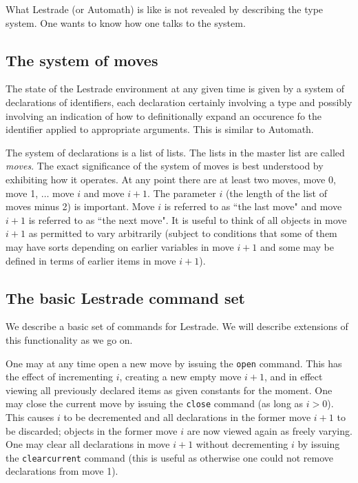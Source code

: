 \documentclass[12pt]{article}
\begin{document}
What Lestrade (or Automath) is like is not revealed by describing the type system.  One wants to know how one talks to the system.

\subsection{The system of moves}

The state of the Lestrade environment at any given time is given by a system of declarations of identifiers, each declaration certainly involving a type and possibly involving an indication of how to definitionally expand an occurence fo the identifier applied to appropriate arguments.  This is similar to Automath.

The system of declarations is a list of lists.  The lists in the master list are called {\em moves\/}.  The exact significance of the system of moves is best understood by exhibiting how it operates.  At any point there are at least two moves, 
move 0, move 1, $\ldots$ move $i$ and move $i+1$.  The parameter $i$ (the length of the list of moves minus 2) is important.  Move $i$ is referred to as ``the last move" and move $i+1$ is referred to as ``the next move".  It is useful to think
of all objects in move $i+1$ as permitted to vary arbitrarily (subject to conditions that some of them may have sorts depending on earlier variables in move $i+1$ and some may be defined in terms of earlier items in move $i+1$).

\subsection{The basic Lestrade command set}

We describe a basic set of commands for Lestrade.  We will describe extensions of this functionality as we go on.

One may at any time open a new move by issuing the {\tt open} command.  This has the effect of incrementing $i$, creating a new empty move $i+1$, and in effect viewing all previously declared items as given constants for the moment.  One may close the current move by issuing the {\tt close} command
(as long as $i>0$).  This causes $i$ to be decremented and all declarations in the former move $i+1$ to be discarded;  objects in the former move $i$ are now viewed again as freely varying.   One may clear all declarations in move $i+1$ without decrementing $i$ by issuing the {\tt clearcurrent} command (this is useful as otherwise one could not remove declarations from move 1).
\end{document}
